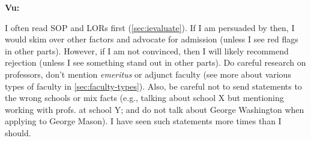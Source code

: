 \documentclass[oneside,11pt,dvipsnames]{book}
\newenvironment{commentbox}[1][]{
  \small
  \begin{mybox}
    {\small \textbf{#1}}
  }{
  \end{mybox}
}
\begin{document}
\begin{commentbox}[Vu:]
  I often read SOP and LORs first (\autoref{sec:ievaluate}). If I am
  persuaded by then, I would skim over other factors and advocate for
  admission (unless I see red flags in other parts). However, if I am not
  convinced, then I will likely recommend rejection (unless I see
  something stand out in other parts).
  \tcblower
  Do careful research on professors, don't mention \emph{emeritus} or adjunct faculty (see more about various types of faculty in \autoref{sec:faculty-types}).
  Also, be careful not to send statements to the wrong schools or mix
  facts (e.g., talking about school X but mentioning working with
  profs. at school Y; and do not talk about George Washington when applying to George Mason). I have seen such statements more times than I should.
\end{commentbox}


\end{document}
